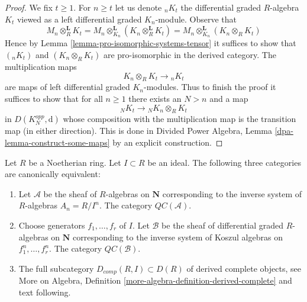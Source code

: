 \begin{proof}
We fix $t \geq 1$. For $n \geq t$ let us denote ${}_nK_t$
the differential graded $R$-algebra $K_t$ viewed as a left differential graded
$K_n$-module. Observe that
$$
M_n \otimes_R^\mathbf{L} K_t =
M_n \otimes_{K_n}^\mathbf{L} (K_n \otimes_R^\mathbf{L} K_t) =
M_n \otimes_{K_n}^\mathbf{L} (K_n \otimes_R K_t)
$$
Hence by Lemma \ref{lemma-pro-isomorphic-systems-tensor}
it suffices to show that
$({}_nK_t)$ and $(K_n \otimes_R K_t)$ are pro-isomorphic in the
derived category. The multiplication maps
$$
K_n \otimes_R K_t \longrightarrow {}_nK_t
$$
are maps of left differential graded $K_n$-modules. Thus to finish the proof
it suffices to show that for all $n \geq 1$ there exists an $N > n$
and a map
$$
{}_NK_t \longrightarrow {}_NK_n \otimes_R K_t
$$
in $D(K_N^{opp}, \text{d})$ whose composition with the multiplication
map is the transition map (in either direction). This is done in
Divided Power Algebra, Lemma \ref{dpa-lemma-construct-some-maps}
by an explicit construction.
\end{proof}

\begin{proposition}
\label{proposition-derived-complete}
Let $R$ be a Noetherian ring. Let $I \subset R$ be an ideal.
The following three categories are canonically equivalent:
\begin{enumerate}
\item Let $\mathcal{A}$ be the sheaf of $R$-algebras on $\mathbf{N}$
corresponding to the inverse system of $R$-algebras $A_n = R/I^n$.
The category $\mathit{QC}(\mathcal{A})$.
\item Choose generators $f_1, \ldots, f_r$ of $I$. Let
$\mathcal{B}$ be the sheaf of differential graded $R$-algebras
on $\mathbf{N}$ corresponding to the inverse system of
Koszul algebras on $f_1^n, \ldots, f_r^n$.
The category $\mathit{QC}(\mathcal{B})$.
\item The full subcategory $D_{comp}(R, I) \subset D(R)$
of derived complete objects, see More on Algebra, Definition
\ref{more-algebra-definition-derived-complete} and text following.
\end{enumerate}
\end{proposition}

